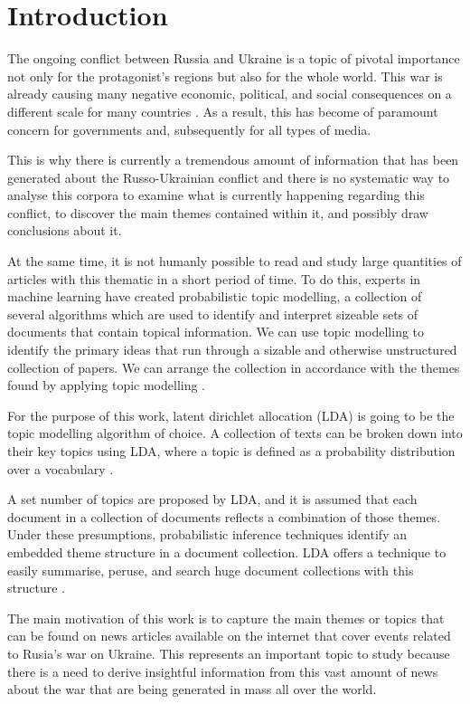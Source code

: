 \documentclass[twoside,12pt,a4paper]{article}
\begin{document}
\section{Introduction}
The ongoing conflict between Russia and Ukraine is a topic of pivotal importance not only for the protagonist's regions but also for the whole world. This war is already causing many negative economic, political, and social consequences on a different scale for many countries \citep{caldara_effect_2022}. As a result, this has become of paramount concern for governments and, subsequently for all types of media.

This is why there is currently a tremendous amount of information that has been generated about the Russo-Ukrainian conflict and there is no systematic way to analyse this corpora to examine what is currently happening regarding this conflict, to discover the main themes contained within it, and possibly draw conclusions about it.

At the same time, it is not humanly possible to read and study large quantities of articles with this thematic in a short period of time. To do this, experts in machine learning have created probabilistic topic modelling, a collection of several algorithms which are used to identify and interpret sizeable sets of documents that contain topical information. We can use topic modelling to identify the primary ideas that run through a sizable and otherwise unstructured collection of papers. We can arrange the collection in accordance with the themes found by applying topic modelling \citep{blei_probabilistic_2012}.

For the purpose of this work, latent dirichlet allocation (LDA) is going to be the topic modelling algorithm of choice. A collection of texts can be broken down into their key topics using LDA, where a topic is defined as a probability distribution over a vocabulary \citep{blei_latent_nodate}.

A set number of topics are proposed by LDA, and it is assumed that each document in a collection of documents reflects a combination of those themes. Under these presumptions, probabilistic inference techniques identify an embedded theme structure in a document collection. LDA offers a technique to easily summarise, peruse, and search huge document collections with this structure \citep{blei_probabilistic_2010}.

The main motivation of this work is to capture the main themes or topics that can be found on news articles available on the internet that cover events related to Rusia’s war on Ukraine. This represents an important topic to study because there is a need to derive insightful information from this vast amount of news about the war that are being generated in mass all over the world.
\end{document}
